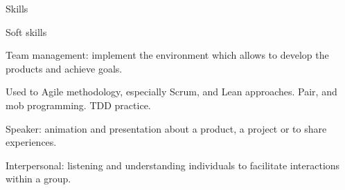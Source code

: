 \begin{rSection}{Skills}
  \begin{rSubsection}{Soft skills}{}{}{}
    \item[] Team management: implement the environment which allows to develop the products and achieve goals.
    \item[] Used to Agile methodology, especially Scrum, and Lean approaches. Pair, and mob programming. TDD practice.
    \item[] Speaker: animation and presentation about a product, a project or to share experiences.
    \item[] Interpersonal: listening and understanding individuals to facilitate interactions within a group.
  \end{rSubsection}

\end{rSection}
